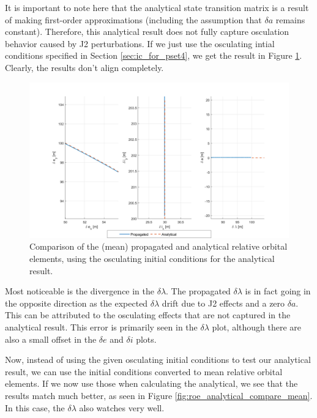\cite{koenig2017new}

It is important to note here that the analytical state transition matrix is a result of making first-order approximations (including the assumption that $\delta a$ remains constant). Therefore, this analytical result does not fully capture osculation behavior caused by J2 perturbations. If we just use the osculating intial conditions specified in Section \ref{sec:ic_for_pset4}, we get the result in Figure \ref{fig:roe_analytical_compare_osc}. Clearly, the results don't align completely.

\begin{figure}[htpb]
    \centering
    \includegraphics[width=0.8\linewidth]{sim/figures/PS4/ROE_analytical_compare_given_IC2_SV2.png}
    \caption{Comparison of the (mean) propagated and analytical relative orbital elements, using the osculating initial conditions for the analytical result.}
\label{fig:roe_analytical_compare_osc}
\end{figure}

Most noticeable is the divergence in the $\delta \lambda$. The propagated $\delta \lambda$ is in fact going in the opposite direction as the expected $\delta \lambda$ drift due to J2 effects and a zero $\delta a$. This can be attributed to the osculating effects that are not captured in the analytical result. This error is primarily seen in the $\delta \lambda$ plot, although there are also a small offset in the $\delta e$ and $\delta i$ plots.

Now, instead of using the given osculating initial conditions to test our analytical result, we can use the initial conditions converted to mean relative orbital elements. If we now use those when calculating the analytical, we see that the results match much better, as seen in Figure \ref{fig:roe_analytical_compare_mean}. In this case, the $\delta \lambda$ also watches very well.


